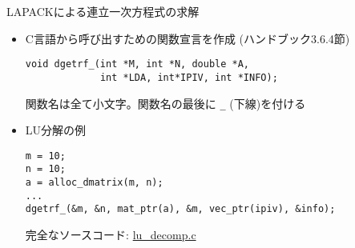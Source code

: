 \begin{frame}[t,fragile]{LAPACKによる連立一次方程式の求解}
  \begin{itemize}
    \setlength{\itemsep}{1em}
  \item C言語から呼び出すための関数宣言を作成 (ハンドブック3.6.4節)
\begin{lstlisting}
void dgetrf_(int *M, int *N, double *A,
             int *LDA, int*IPIV, int *INFO);
\end{lstlisting}
関数名は全て小文字。関数名の最後に {\tt \_} (下線)を付ける
\item LU分解の例
\begin{lstlisting}
m = 10;
n = 10;
a = alloc_dmatrix(m, n);
...
dgetrf_(&m, &n, mat_ptr(a), &m, vec_ptr(ipiv), &info);
\end{lstlisting}
完全なソースコード: \href{https://github.com/todo-group/computer-experiments/blob/master/exercise/linear_system/lu_decomp.c}{lu\_decomp.c}
  \end{itemize}
\end{frame}

